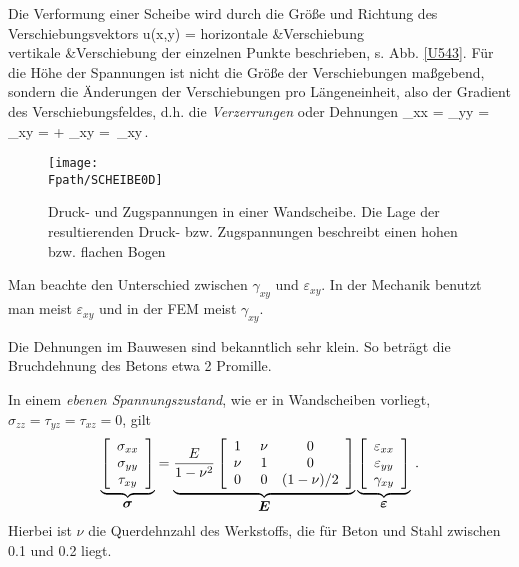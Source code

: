 {Die Verformung einer Scheibe wird durch die Gr\"{o}{\ss}e und Richtung des Verschiebungsvektors
\bfo
 \vek u(x,y) =  \left[ \begin{array}{r }
u(x,y) \\ v(x,y) \end{array} \right] \qquad {} \mbox{horizontale} &\mbox{Verschiebung} \\
\mbox{vertikale} &\mbox{Verschiebung} \earr
\efo
der einzelnen Punkte beschrieben, s. Abb. \ref{U543}. F\"{u}r die H\"{o}he der Spannungen ist nicht die Gr\"{o}{\ss}e der Verschiebungen ma{\ss}gebend, sondern die \"{A}nderungen der Verschiebungen pro L\"{a}ngeneinheit, also der Gradient des Verschiebungsfeldes, d.h. die {\em Verzerrungen} oder Dehnungen
\bfo
\varepsilon_{xx} =  \qquad \varepsilon_{yy} =
  \qquad \gamma_{xy} =  +
 \qquad \varepsilon_{xy} = 
\,\gamma_{xy}\,.
\efo
\begin{figure}[tbp] \centering
\if {} \sidecaption \fi
\texttt{[image: \\Fpath/SCHEIBE0D]}
\caption{Druck- und Zugspannungen in einer Wandscheibe. Die Lage der resultierenden
Druck- bzw. Zugspannungen beschreibt einen hohen bzw. flachen Bogen} \label{Scheibe0}
\end{figure}%
Man beachte den Unterschied zwischen $\gamma_{xy}$ und $\varepsilon_{xy}$. In der Mechanik benutzt man meist $\varepsilon_{xy}$ und in der FEM meist $\gamma_{xy}$.

Die Dehnungen im Bauwesen sind bekanntlich sehr klein. So betr\"{a}gt die Bruchdehnung des Betons etwa 2
Promille.

In einem {\em ebenen Spannungszustand}, wie er in
Wandscheiben vorliegt, $\sigma_{zz} = \tau_{yz} = \tau_{xz} = 0$, gilt
\begin{align}\label{MatrixE41}
\underbrace{\left[ \barr {c} \sigma_{xx} \\ \sigma_{yy} \\ \tau_{xy} \earr\right]}_{\vek
\sigma} = \underbrace{\frac{E}{1 - \nu^2}\left[ \barr { c c c} 1 & \,\,\nu & 0 \\ \nu &
\,\,1 & 0 \\ 0 & \,\,0 & (1-\nu)/2 \earr \right]}_{\vek E} \underbrace{\left[ \barr {c}
\varepsilon_{xx} \\ \varepsilon_{yy} \\ \gamma_{xy} \earr\right]}_{\vek \varepsilon}\,.
\end{align}
Hierbei ist $\nu$ die Querdehnzahl des Werkstoffs, die f\"{u}r Beton und Stahl zwischen 0.1 und 0.2 liegt.

}
